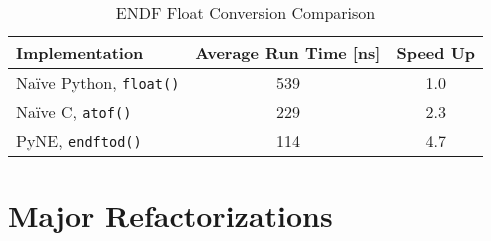 \documentclass{ansconf}
\begin{document}
\begin{table}
\caption{ENDF Float Conversion Comparison}
\label{endftod}
\begin{center}
\begin{tabular}[htbp]{|l|c|c|}
\hline
\textbf{Implementation} & \textbf{Average Run Time [ns]} & \textbf{Speed Up} \\
\hline
Na\"{i}ve Python, \texttt{float()} & 539 & 1.0 \\
\hline
Na\"{i}ve C, \texttt{atof()} & 229 & 2.3 \\
\hline
PyNE, \texttt{endftod()} & 114 & 4.7 \\
\hline
\end{tabular}
\end{center}
\end{table}

\section{Major Refactorizations}



\end{document}
